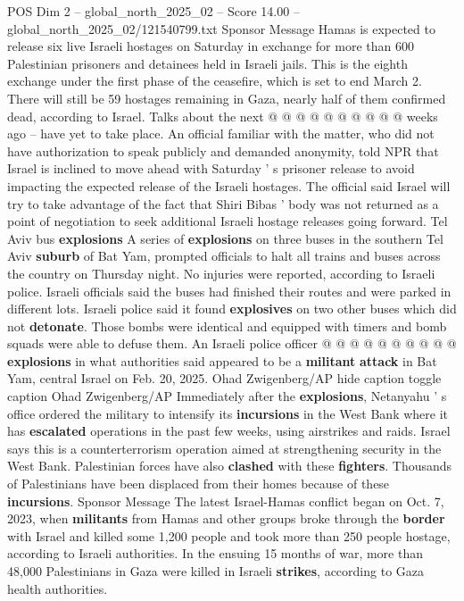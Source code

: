 \begin{textsample}{POS Dim 2 – global\_north\_2025\_02 – Score 14.00 – global\_north\_2025\_02/121540799.txt}
Sponsor Message Hamas is expected to release six live Israeli hostages on Saturday in exchange for more than 600 Palestinian prisoners and detainees held in Israeli jails.
This is the eighth exchange under the first phase of the ceasefire, which is set to end March 2.
There will still be 59 hostages remaining in Gaza, nearly half of them confirmed dead, according to Israel.
Talks about the next @ @ @ @ @ @ @ @ @ @ weeks ago -- have yet to take place.
An official familiar with the matter, who did not have authorization to speak publicly and demanded anonymity, told NPR that Israel is inclined to move ahead with Saturday ' s prisoner release to avoid impacting the expected release of the Israeli hostages.
The official said Israel will try to take advantage of the fact that Shiri Bibas ' body was not returned as a point of negotiation to seek additional Israeli hostage releases going forward.
Tel Aviv bus \textbf{explosions} A series of \textbf{explosions} on three buses in the southern Tel Aviv \textbf{suburb} of Bat Yam, prompted officials to halt all trains and buses across the country on Thursday night.
No injuries were reported, according to Israeli police.
Israeli officials said the buses had finished their routes and were parked in different lots.
Israeli police said it found \textbf{explosives} on two other buses which did not \textbf{detonate}.
Those bombs were identical and equipped with timers and bomb squads were able to defuse them.
An Israeli police officer @ @ @ @ @ @ @ @ @ @ \textbf{explosions} in what authorities said appeared to be a \textbf{militant} \textbf{attack} in Bat Yam, central Israel on Feb. 20, 2025.
Ohad Zwigenberg/AP hide caption toggle caption Ohad Zwigenberg/AP Immediately after the \textbf{explosions}, Netanyahu ' s office ordered the military to intensify its \textbf{incursions} in the West Bank where it has \textbf{escalated} operations in the past few weeks, using airstrikes and raids.
Israel says this is a counterterrorism operation aimed at strengthening security in the West Bank.
Palestinian forces have also \textbf{clashed} with these \textbf{fighters}.
Thousands of Palestinians have been displaced from their homes because of these \textbf{incursions}.
Sponsor Message The latest Israel-Hamas conflict began on Oct. 7, 2023, when \textbf{militants} from Hamas and other groups broke through the \textbf{border} with Israel and killed some 1,200 people and took more than 250 people hostage, according to Israeli authorities.
In the ensuing 15 months of war, more than 48,000 Palestinians in Gaza were killed in Israeli \textbf{strikes}, according to Gaza health authorities.

\end{textsample}
